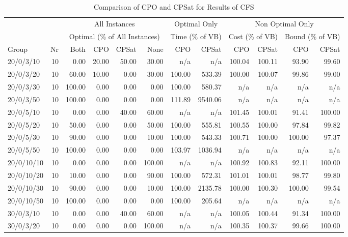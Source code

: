 \begin{table}[htbp]
\caption{\label{tab:comparecfs}Comparison of CPO and CPSat for Results of CFS}
{\scriptsize
\begin{tabular}{lr*{10}{r}} \toprule
& &\multicolumn{4}{c}{All Instances} & \multicolumn{2}{c}{Optimal Only} & \multicolumn{4}{c}{Non Optimal Only}\\ 
& &\multicolumn{4}{c}{Optimal (\% of All Instances)} & \multicolumn{2}{c}{Time (\% of VB)} & \multicolumn{2}{c}{Cost (\% of VB)} & \multicolumn{2}{c}{Bound (\% of VB)}\\ 
Group & Nr & Both & CPO & CPSat & None & CPO & CPSat & CPO & CPSat & CPO & CPSat\\ \midrule
20/0/3/10 & 10 &  0.00 & 20.00 & 50.00 & 30.00 & n/a & n/a & 100.04 & 100.11 & 93.90 & 99.60 \\ 
20/0/3/20 & 10 & 60.00 & 10.00 &  0.00 & 30.00 & 100.00 & 533.39 & 100.00 & 100.07 & 99.86 & 99.00 \\ 
20/0/3/30 & 10 & 100.00 &  0.00 &  0.00 &  0.00 & 100.00 & 580.37 & n/a & n/a & n/a & n/a \\ 
20/0/3/50 & 10 & 100.00 &  0.00 &  0.00 &  0.00 & 111.89 & 9540.06 & n/a & n/a & n/a & n/a \\ 
20/0/5/10 & 10 &  0.00 &  0.00 & 40.00 & 60.00 & n/a & n/a & 101.45 & 100.01 & 91.41 & 100.00 \\ 
20/0/5/20 & 10 & 50.00 &  0.00 &  0.00 & 50.00 & 100.00 & 555.81 & 100.55 & 100.00 & 97.84 & 99.82 \\ 
20/0/5/30 & 10 & 90.00 &  0.00 &  0.00 & 10.00 & 100.00 & 543.33 & 100.71 & 100.00 & 100.00 & 97.37 \\ 
20/0/5/50 & 10 & 100.00 &  0.00 &  0.00 &  0.00 & 103.97 & 1036.94 & n/a & n/a & n/a & n/a \\ 
20/0/10/10 & 10 &  0.00 &  0.00 &  0.00 & 100.00 & n/a & n/a & 100.92 & 100.83 & 92.11 & 100.00 \\ 
20/0/10/20 & 10 & 10.00 &  0.00 &  0.00 & 90.00 & 100.00 & 572.31 & 101.01 & 100.01 & 98.77 & 99.80 \\ 
20/0/10/30 & 10 & 90.00 &  0.00 &  0.00 & 10.00 & 100.00 & 2135.78 & 100.00 & 100.30 & 100.00 & 99.54 \\ 
20/0/10/50 & 10 & 100.00 &  0.00 &  0.00 &  0.00 & 100.00 & 205.64 & n/a & n/a & n/a & n/a \\ 
30/0/3/10 & 10 &  0.00 &  0.00 & 40.00 & 60.00 & n/a & n/a & 100.05 & 100.44 & 91.34 & 100.00 \\ 
30/0/3/20 & 10 &  0.00 &  0.00 &  0.00 & 100.00 & n/a & n/a & 100.35 & 100.37 & 99.66 & 100.00 \\ 

\end{tabular}}
\end{table}

